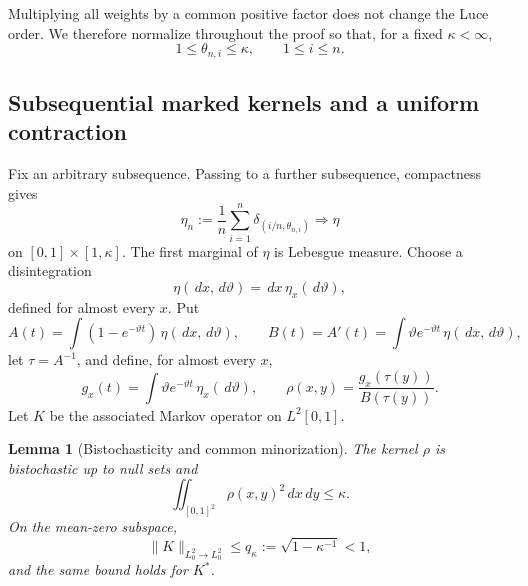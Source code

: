 \documentclass[11pt]{article}
\newtheorem{lemma}[theorem]{Lemma}
\theoremstyle{remark}
\newcommand{\dd}{\,d}
\begin{document}
Multiplying all weights by a common positive factor does not change the Luce
order.  We therefore normalize throughout the proof so that, for a fixed
$\kappa<\infty$,
\begin{equation}
        1\le\theta_{n,i}\le\kappa,
        \qquad 1\le i\le n.
        \tag{6.0}\label{eq:pd-normalized-rates}
\end{equation}

\subsection{Subsequential marked kernels and a uniform contraction}

Fix an arbitrary subsequence.  Passing to a further subsequence, compactness
gives
\[
 \eta_n:=\frac1n\sum_{i=1}^n\delta_{(i/n,\theta_{n,i})}
 \Longrightarrow\eta
\]
on $[0,1]\times[1,\kappa]$.  The first marginal of $\eta$ is Lebesgue
measure.  Choose a disintegration
\[
        \eta(\dd x,\dd\vartheta)=\dd x\,\eta_x(\dd\vartheta),
\]
defined for almost every $x$.  Put
\[
 A(t)=\int(1-e^{-\vartheta t})\,\eta(\dd x,\dd\vartheta),
 \qquad
 B(t)=A'(t)=\int\vartheta e^{-\vartheta t}\,
 \eta(\dd x,\dd\vartheta),
\]
let $\tau=A^{-1}$, and define, for almost every $x$,
\[
 g_x(t)=\int\vartheta e^{-\vartheta t}\,\eta_x(\dd\vartheta),
 \qquad
 \rho(x,y)=\frac{g_x(\tau(y))}{B(\tau(y))}.
\]
Let $K$ be the associated Markov operator on $L^2[0,1]$.

\begin{lemma}[Bistochasticity and common minorization]
\label{lem:pd-kernel-contraction}
The kernel $\rho$ is bistochastic up to null sets and
\[
        \iint_{[0,1]^2}\rho(x,y)^2\dd x\dd y\le\kappa.
\]
On the mean-zero subspace,
\[
        \|K\|_{L^2_0\to L^2_0}
        \le q_\kappa:=\sqrt{1-\kappa^{-1}}<1,
\]
and the same bound holds for $K^*$.
\end{lemma}
\end{document}
